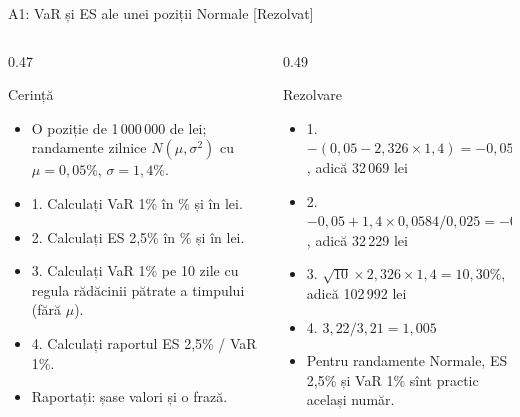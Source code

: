 \begin{frame}{A1: VaR și ES ale unei poziții Normale [Rezolvat]}
\itemsize{\scriptsize}
\begin{columns}[T]
\begin{column}{0.47\textwidth}
\begin{block}{Cerință}
\begin{itemize}
    \item O poziție de 1\,000\,000 de lei; randamente zilnice $N(\mu, \sigma^2)$ cu $\mu = 0{,}05\%$, $\sigma = 1{,}4\%$.
    \item 1. Calculați VaR 1\% în \% și în lei.
    \item 2. Calculați ES 2,5\% în \% și în lei.
    \item 3. Calculați VaR 1\% pe 10 zile cu regula rădăcinii pătrate a timpului (fără $\mu$).
    \item 4. Calculați raportul ES 2,5\% / VaR 1\%.
    \item Raportați: șase valori și o frază.
\end{itemize}
\end{block}
\end{column}
\begin{column}{0.49\textwidth}
\begin{exampleblock}{Rezolvare}
\begin{itemize}
    \item 1. $-(0{,}05 - 2{,}326 \times 1{,}4) = -0{,}05 + 3{,}256 = 3{,}21\%$, adică 32\,069 lei
    \item 2. $-0{,}05 + 1{,}4 \times 0{,}0584/0{,}025 = -0{,}05 + 3{,}270 = 3{,}22\%$, adică 32\,229 lei
    \item 3. $\sqrt{10} \times 2{,}326 \times 1{,}4 = 10{,}30\%$, adică 102\,992 lei
    \item 4. $3{,}22/3{,}21 = 1{,}005$
    \item Pentru randamente Normale, ES 2,5\% și VaR 1\% sînt practic același număr.
\end{itemize}
\end{exampleblock}
\end{column}
\end{columns}
\end{frame}

